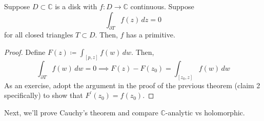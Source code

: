 	\begin{theorem}
	  \label{thm:goursats-theorem-on-a-disk}
		Suppose $D \subset \mathbb{C}$ is a disk with $f: D \to \mathbb{C}$ continuous. Suppose 
		\begin{equation}
			\int_{\partial T} f(z) \,dz = 0
		\end{equation}
		for all closed triangles $T \subset D$. Then, $f$ has a primitive. 
	\end{theorem}
	\begin{proof}
	  Define $F(z) \coloneqq \int_{[p, z]} f(w)\,dw$. Then, 
		\begin{equation}
			\int_{\partial T} f(w) \,dw = 0 \implies F(z) - F(z_0) = \int_{[z_0, z]} f(w) \,dw 
		\end{equation}
		As an exercise, adopt the argument in the proof of the previous theorem (claim 2 specifically) to show that $F^\prime (z_0) = f(z_0)$. 
	\end{proof} 

	Next, we'll prove Cauchy's theorem and compare $\mathbb{C}$-analytic vs holomorphic. 



